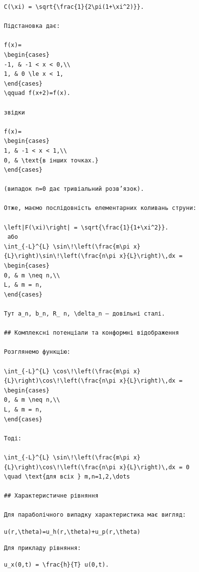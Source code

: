 \documentclass[
  ukrainian,
]{article}
\begin{document}
\begin{verbatim}
C(\xi) = \sqrt{\frac{1}{2\pi(1+\xi^2)}}.

Підстановка дає:

f(x)=
\begin{cases}
-1, & -1 < x < 0,\\
1, & 0 \le x < 1,
\end{cases}
\qquad f(x+2)=f(x).

звідки

f(x)=
\begin{cases}
1, & -1 < x < 1,\\
0, & \text{в інших точках.}
\end{cases}

(випадок n=0 дає тривіальний розв’язок).

Отже, маємо послідовність елементарних коливань струни:

\left|F(\xi)\right| = \sqrt{\frac{1}{1+\xi^2}}.
 або 
\int_{-L}^{L} \sin\!\left(\frac{m\pi x}{L}\right)\sin\!\left(\frac{n\pi x}{L}\right)\,dx =
\begin{cases}
0, & m \neq n,\\
L, & m = n,
\end{cases}

Тут a_n, b_n, R_ n, \delta_n — довільні сталі.

## Комплексні потенціали та конформні відображення

Розглянемо функцію:

\int_{-L}^{L} \cos\!\left(\frac{m\pi x}{L}\right)\cos\!\left(\frac{n\pi x}{L}\right)\,dx =
\begin{cases}
0, & m \neq n,\\
L, & m = n,
\end{cases}

Тоді:

\int_{-L}^{L} \sin\!\left(\frac{m\pi x}{L}\right)\cos\!\left(\frac{n\pi x}{L}\right)\,dx = 0
\quad \text{для всіх } m,n=1,2,\dots

## Характеристичне рівняння

Для параболічного випадку характеристика має вигляд:
\end{verbatim}

\texttt{u(r,\textbackslash{}theta)=u\_h(r,\textbackslash{}theta)+u\_p(r,\textbackslash{}theta)}

\begin{verbatim}
Для прикладу рівняння:
\end{verbatim}

\texttt{u\_x(0,t)\ =\ \textbackslash{}frac\{h\}\{T\}\ u(0,t).}
\end{document}
